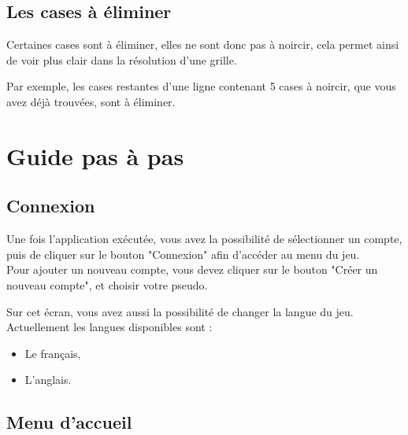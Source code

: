 \documentclass[a4paper, 12pt]{report}
\begin{document}
		\section{Les cases à éliminer}
            
            Certaines cases sont à éliminer, elles ne sont donc pas à noircir, cela permet ainsi de voir plus clair dans la résolution d'une grille.
            
            Par exemple, les cases restantes d'une ligne contenant 5 cases à noircir, que vous avez déjà trouvées, sont à éliminer.




\chapter{Guide pas à pas}
\thispagestyle{empty}
\thispagestyle{plain}

	\section{Connexion}

        Une fois l'application exécutée, vous avez la possibilité de sélectionner un compte, puis de cliquer sur le bouton "Connexion" afin d'accéder au menu du jeu. \\
        Pour ajouter un nouveau compte, vous devez cliquer sur le bouton "Créer un nouveau compte", et choisir votre pseudo.
        
        Sur cet écran, vous avez aussi la possibilité de changer la langue du jeu. Actuellement les langues disponibles sont :
        \begin{itemize}
            \item Le français,
            \item L'anglais.
        \end{itemize}
        

	\section{Menu d'accueil}
\end{document}
